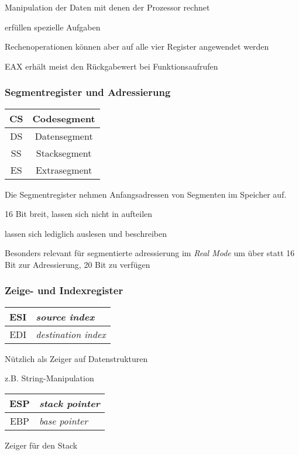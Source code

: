 Manipulation der Daten mit denen der Prozessor rechnet

erfüllen spezielle Aufgaben

Rechenoperationen können aber auf alle vier Register angewendet werden

EAX erhält meist den Rückgabewert bei Funktionsaufrufen



\subsubsection{Segmentregister und Adressierung}

\begin{tabular}{|c|c|}
\hline CS & Codesegment \\
\hline DS & Datensegment \\
\hline SS & Stacksegment \\
\hline ES & Extrasegment\\
\hline
\end{tabular}

Die Segmentregister nehmen Anfangsadressen von Segmenten im Speicher auf.

16 Bit breit, lassen sich nicht in aufteilen

lassen sich lediglich auslesen und beschreiben

Besonders relevant für segmentierte adressierung im \emph{Real Mode} um über statt 16 Bit
zur Adressierung, 20 Bit zu verfügen

\subsubsection{Zeige- und Indexregister}

\begin{tabular}{|c|l|}
\hline ESI & \emph{source index} \\
\hline EDI & \emph{destination index} \\
\hline
\end{tabular}

Nützlich als Zeiger auf Datenstrukturen

z.B. String-Manipulation


\begin{tabular}{|c|l|}
\hline ESP & \emph{stack pointer}\\
\hline EBP & \emph{base pointer} \\
\hline
\end{tabular}

Zeiger für den Stack

